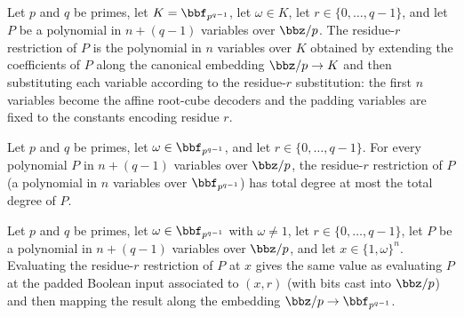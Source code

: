 \begin{definition}
\label{RazborovSmolensky.paddedResiduePolynomial}
\leanok
{}
Let $p$ and $q$ be primes, let $K = \bbf_{p^{q-1}}$, let $\omega \in K$, let
$r \in \{0,\dots,q-1\}$, and let $P$ be a polynomial in $n + (q-1)$ variables over
$\bbz/p$.  The residue-$r$ restriction of $P$ is the polynomial in $n$ variables over $K$
obtained by extending the coefficients of $P$ along the canonical embedding
$\bbz/p \to K$ and then substituting each variable according to the residue-$r$
substitution: the first $n$ variables become the affine root-cube decoders and the
padding variables are fixed to the constants encoding residue $r$.
\end{definition}

\begin{theorem}
\label{RazborovSmolensky.paddedResiduePolynomial_totalDegree_le}
\leanok
{}
Let $p$ and $q$ be primes, let $\omega \in \bbf_{p^{q-1}}$, and let
$r \in \{0,\dots,q-1\}$.  For every polynomial $P$ in $n + (q-1)$ variables over
$\bbz/p$, the residue-$r$ restriction of $P$ (a polynomial in $n$ variables over
$\bbf_{p^{q-1}}$) has total degree at most the total degree of $P$.
\end{theorem}

\begin{theorem}
\label{RazborovSmolensky.paddedResiduePolynomial_eval_eq_map_eval}
\leanok
{}
Let $p$ and $q$ be primes, let $\omega \in \bbf_{p^{q-1}}$ with $\omega \neq 1$, let
$r \in \{0,\dots,q-1\}$, let $P$ be a polynomial in $n + (q-1)$ variables over $\bbz/p$,
and let $x \in \{1,\omega\}^n$.  Evaluating the residue-$r$ restriction of $P$ at $x$
gives the same value as evaluating $P$ at the padded Boolean input associated to
$(x, r)$ (with bits cast into $\bbz/p$) and then mapping the result along the embedding
$\bbz/p \to \bbf_{p^{q-1}}$.
\end{theorem}

